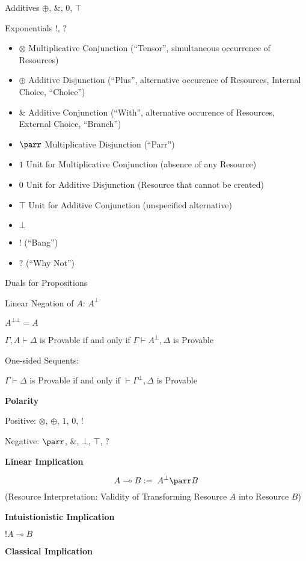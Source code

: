 Additives $\oplus$, $\&$, $0$, $\top$

Exponentials $!$, $?$

\begin{itemize}
  \item $\otimes$ Multiplicative Conjunction (``Tensor'', simultaneous
    occurrence of Resources)
  \item $\oplus$ Additive Disjunction (``Plus'', alternative occurence
    of Resources, Internal Choice, ``Choice'')
  \item $\&$ Additive Conjunction (``With'', alternative occurence of
    Resources, External Choice, ``Branch'')
  \item $\parr$ Multiplicative Disjunction (``Parr'')
  \item $1$ Unit for Multiplicative Conjunction (absence of any
    Resource)
  \item $0$ Unit for Additive Disjunction (Resource that cannot be
    created)
  \item $\top$ Unit for Additive Conjunction (unspecified alternative)
  \item $\bot$
  \item $!$ (``Bang'')
  \item $?$ (``Why Not'')
\end{itemize}

Duals for Propositions %

Linear Negation of $A$: $A^\bot$

$A^{\bot\bot} = A$

\cite{llwiki16}
$\Gamma, A \vdash \Delta$ is Provable if and only if $\Gamma \vdash
A^\bot, \Delta$ is Provable

One-sided Sequents:

$\Gamma \vdash \Delta$ is Provable if and only if $\vdash \Gamma^\bot,
\Delta$ is Provable


\textbf{Polarity}

Positive: $\otimes$, $\oplus$, $1$, $0$, $!$

Negative: $\parr$, $\&$, $\bot$, $\top$, $?$


\textbf{Linear Implication}

\[
  A \multimap B := \; A^{\bot} \parr B
\]
(Resource Interpretation: Validity of Transforming Resource $A$ into
Resource $B$)


\textbf{Intuistionistic Implication}

$!A \multimap B$


\textbf{Classical Implication}

